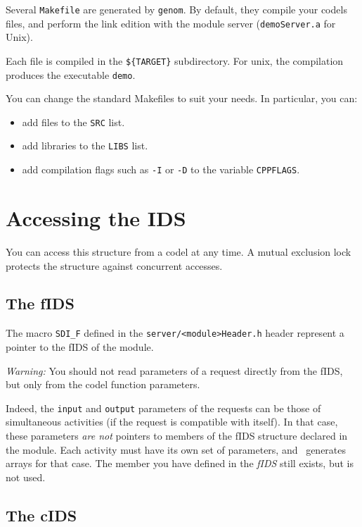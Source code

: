 Several \texttt{Makefile} are generated   by \texttt{genom}.  By default, they
compile your codels  files, and perform the  link edition with the module
server (\texttt{demoServer.a} for Unix).

Each file  is compiled in the \texttt{\$\{TARGET\}} subdirectory. For unix,
the compilation  produces the executable \texttt{demo}.

You can change the standard Makefiles to suit your needs. In particular,
you can:

\begin{itemize}
\item add files to the \texttt{SRC} list.
\item add libraries to the \texttt{LIBS} list.
\item add compilation flags such as \texttt{-I} or \texttt{-D} to the  variable
\texttt{CPPFLAGS}.
\end{itemize}


\section{Accessing the IDS}

You can access   this  structure from a  codel  at  any time.   A  mutual
exclusion lock protects the structure against concurrent accesses.

\subsection{The fIDS}

The macro \texttt{SDI\_F}  defined in the \texttt{server/<module>Header.h} header
represent a pointer to the fIDS of the module.

\emph{Warning:} 
 You should not read parameters
of  a  request  directly  from the  fIDS,  but only from the codel
function parameters.

Indeed, the   \texttt{input}  and \texttt{output} parameters  of   the
requests  can  be those  of simultaneous activities  (if  the  request is
compatible with  itself).  In that case, these  parameters \emph{are not}
pointers to members of  the fIDS structure declared in  the module.  Each
activity  must have  its own  set  of  parameters, and \GenoM\  generates
arrays for that case. The member you have defined in the \emph{fIDS} still
exists, but is not used.

\subsection{The cIDS}

